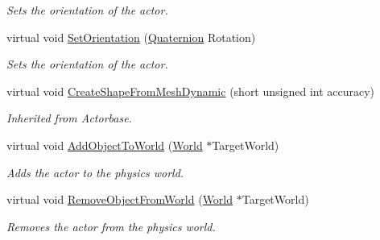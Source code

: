 \begin{DoxyCompactItemize}
\begin{DoxyCompactList}\small\item\em Sets the orientation of the actor. \item\end{DoxyCompactList}\item 
virtual void \hyperlink{classphys_1_1ActorSoft_ad57b502da0658de31a4b3a9bb9be7900}{SetOrientation} (\hyperlink{classphys_1_1Quaternion}{Quaternion} Rotation)
\begin{DoxyCompactList}\small\item\em Sets the orientation of the actor. \item\end{DoxyCompactList}\item 
\hypertarget{classphys_1_1ActorSoft_aaa8bb89969831c8bc727d7aba230d862}{
virtual void \hyperlink{classphys_1_1ActorSoft_aaa8bb89969831c8bc727d7aba230d862}{CreateShapeFromMeshDynamic} (short unsigned int accuracy)}
\label{d4/d23/classphys_1_1ActorSoft_aaa8bb89969831c8bc727d7aba230d862}

\begin{DoxyCompactList}\small\item\em Inherited from Actorbase. \item\end{DoxyCompactList}\item 
virtual void \hyperlink{classphys_1_1ActorSoft_a5f97915d1cda0d048853718714a26d93}{AddObjectToWorld} (\hyperlink{classphys_1_1World}{World} $\ast$TargetWorld)
\begin{DoxyCompactList}\small\item\em Adds the actor to the physics world. \item\end{DoxyCompactList}\item 
virtual void \hyperlink{classphys_1_1ActorSoft_ab65d106fcc1ee5243a990e7b42326bf0}{RemoveObjectFromWorld} (\hyperlink{classphys_1_1World}{World} $\ast$TargetWorld)
\begin{DoxyCompactList}\small\item\em Removes the actor from the physics world. \item\end{DoxyCompactList}\end{DoxyCompactItemize}
